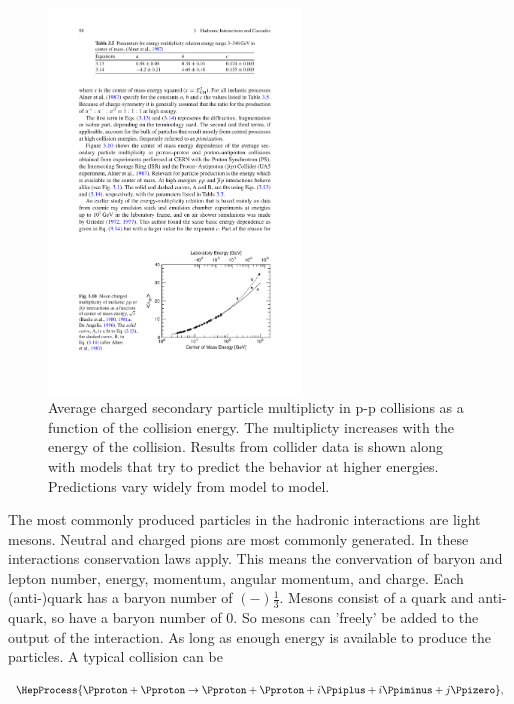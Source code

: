 \begin{figure}
    \centering
    \includegraphics[width=0.6\textwidth]
                    {plots/cosmic-rays/multiplicity}
    \caption{Average charged secondary particle multiplicty in p-p collisions as a function of the collision energy. The multiplicty increases with the energy of the collision. Results from collider data is shown along with models that try to predict the behavior at higher energies. Predictions vary widely from model to model.}
    \label{fig:multiplicity}
\end{figure}

The most commonly produced particles in the hadronic interactions are light mesons. Neutral and charged pions are most commonly generated. In these interactions conservation laws apply. This means the convervation of baryon and lepton number, energy, momentum, angular momentum, and charge. Each (anti-)quark has a baryon number of $(-)\frac{1}{3}$. Mesons consist of a quark and anti-quark, so have a baryon number of 0. So mesons can 'freely' be added to the output of the interaction. As long as enough energy is available to produce the particles. A typical collision can be

\begin{equation}
\HepProcess{\Pproton + \Pproton \to \Pproton + \Pproton + i \Ppiplus + i \Ppiminus + j \Ppizero},
\end{equation}

